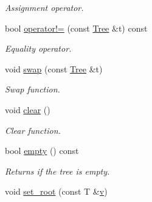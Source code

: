 \begin{DoxyCompactItemize}
\begin{DoxyCompactList}\small\item\em Assignment operator. \end{DoxyCompactList}\item 
bool \hyperlink{class_d_o_1_1_tree_a72e422ad913c00d5443bfe02530394a1}{operator!=} (const \hyperlink{class_d_o_1_1_tree}{Tree} \&t) const 
\begin{DoxyCompactList}\small\item\em Equality operator. \end{DoxyCompactList}\item 
\hypertarget{class_d_o_1_1_tree_a4ef88b6304d9d660dece87018d740033}{void \hyperlink{class_d_o_1_1_tree_a4ef88b6304d9d660dece87018d740033}{swap} (const \hyperlink{class_d_o_1_1_tree}{Tree} \&t)}\label{class_d_o_1_1_tree_a4ef88b6304d9d660dece87018d740033}

\begin{DoxyCompactList}\small\item\em Swap function. \end{DoxyCompactList}\item 
\hypertarget{class_d_o_1_1_tree_ac8bb3912a3ce86b15842e79d0b421204}{void \hyperlink{class_d_o_1_1_tree_ac8bb3912a3ce86b15842e79d0b421204}{clear} ()}\label{class_d_o_1_1_tree_ac8bb3912a3ce86b15842e79d0b421204}

\begin{DoxyCompactList}\small\item\em Clear function. \end{DoxyCompactList}\item 
\hypertarget{class_d_o_1_1_tree_ac6e61de369e994009e36f344f99c15ad}{bool \hyperlink{class_d_o_1_1_tree_ac6e61de369e994009e36f344f99c15ad}{empty} () const }\label{class_d_o_1_1_tree_ac6e61de369e994009e36f344f99c15ad}

\begin{DoxyCompactList}\small\item\em Returns if the tree is empty. \end{DoxyCompactList}\item 
\hypertarget{class_d_o_1_1_tree_a37a865cf4e8665ad843cbd3fa7fac805}{void \hyperlink{class_d_o_1_1_tree_a37a865cf4e8665ad843cbd3fa7fac805}{set\-\_\-root} (const T \&\hyperlink{group___channel_accessors_ga1dd2524c5b8d3db33137eedb803fc2ce}{v})}\label{class_d_o_1_1_tree_a37a865cf4e8665ad843cbd3fa7fac805}


\end{DoxyCompactItemize}
